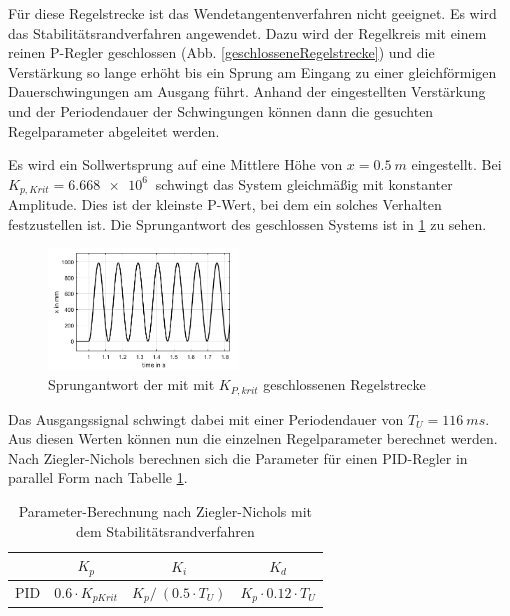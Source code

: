 Für diese Regelstrecke ist das Wendetangentenverfahren nicht geeignet.
Es wird das Stabilitätsrandverfahren angewendet.
Dazu wird der Regelkreis mit einem reinen P-Regler geschlossen (Abb. \ref{geschlosseneRegelstrecke}) und die Verstärkung so lange erhöht bis ein Sprung 
am Eingang zu einer gleichförmigen Dauerschwingungen am Ausgang führt. Anhand der eingestellten Verstärkung und der	
Periodendauer der Schwingungen können dann die gesuchten 
Regelparameter abgeleitet werden.

Es wird ein Sollwertsprung auf eine Mittlere Höhe von $x = \SI{0,5}{m}$ eingestellt. Bei $K_{p, Krit} = \SI{6,668e6}{} $ schwingt das System gleichmäßig mit konstanter Amplitude.
Dies ist der kleinste P-Wert, bei dem ein solches Verhalten festzustellen ist.
Die Sprungantwort des geschlossen Systems ist in \ref{geschlosseneRegelstreckeP} zu sehen.

\begin{figure}[h] 
	\centering
		\includegraphics[width=0.45\textwidth]{Bilder/schwingendeStepresponse.png}
	\caption{Sprungantwort der mit mit $K_{P, krit}$ geschlossenen Regelstrecke}
	\label{geschlosseneRegelstreckeP}
\end{figure}

Das Ausgangssignal schwingt dabei mit einer Periodendauer von
$T_{U} = \SI{116}{ms}$. Aus diesen Werten können nun die einzelnen 
Regelparameter berechnet werden.
Nach Ziegler-Nichols berechnen sich die Parameter für
einen PID-Regler in parallel Form nach Tabelle \ref{tbl:PID}.




\begin{table}[hb]

\normalsize

\caption{Parameter-Berechnung nach Ziegler-Nichols mit dem Stabilitätsrandverfahren}

\label{tbl:PID}

\centering

\begin{tabular}{c|c|c|c}

& $K_p$ & $K_i$ & $K_d$\\

\hline

PID & $0.6 \cdot K_{pKrit}$ & $K_p/~(0.5 \cdot T_U)$ & $K_p \cdot 0.12 \cdot T_U$\\

\end{tabular}

\end{table}


